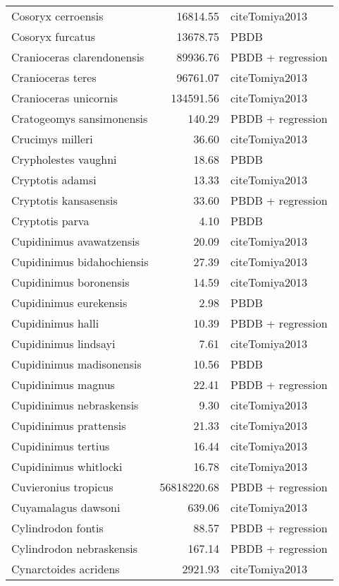 \begin{table}[ht]
\begin{tabular}{lrl}
  Cosoryx cerroensis & 16814.55 & cite{Tomiya2013} \\ 
  Cosoryx furcatus & 13678.75 & PBDB \\ 
  Cranioceras clarendonensis & 89936.76 & PBDB + regression \\ 
  Cranioceras teres & 96761.07 & cite{Tomiya2013} \\ 
  Cranioceras unicornis & 134591.56 & cite{Tomiya2013} \\ 
  Cratogeomys sansimonensis & 140.29 & PBDB + regression \\ 
  Crucimys milleri & 36.60 & cite{Tomiya2013} \\ 
  Crypholestes vaughni & 18.68 & PBDB \\ 
  Cryptotis adamsi & 13.33 & cite{Tomiya2013} \\ 
  Cryptotis kansasensis & 33.60 & PBDB + regression \\ 
  Cryptotis parva & 4.10 & PBDB \\ 
  Cupidinimus avawatzensis & 20.09 & cite{Tomiya2013} \\ 
  Cupidinimus bidahochiensis & 27.39 & cite{Tomiya2013} \\ 
  Cupidinimus boronensis & 14.59 & cite{Tomiya2013} \\ 
  Cupidinimus eurekensis & 2.98 & PBDB \\ 
  Cupidinimus halli & 10.39 & PBDB + regression \\ 
  Cupidinimus lindsayi & 7.61 & cite{Tomiya2013} \\ 
  Cupidinimus madisonensis & 10.56 & PBDB \\ 
  Cupidinimus magnus & 22.41 & PBDB + regression \\ 
  Cupidinimus nebraskensis & 9.30 & cite{Tomiya2013} \\ 
  Cupidinimus prattensis & 21.33 & cite{Tomiya2013} \\ 
  Cupidinimus tertius & 16.44 & cite{Tomiya2013} \\ 
  Cupidinimus whitlocki & 16.78 & cite{Tomiya2013} \\ 
  Cuvieronius tropicus & 56818220.68 & PBDB + regression \\ 
  Cuyamalagus dawsoni & 639.06 & cite{Tomiya2013} \\ 
  Cylindrodon fontis & 88.57 & PBDB + regression \\ 
  Cylindrodon nebraskensis & 167.14 & PBDB + regression \\ 
  Cynarctoides acridens & 2921.93 & cite{Tomiya2013} \\ 

\end{tabular}
\end{table}
